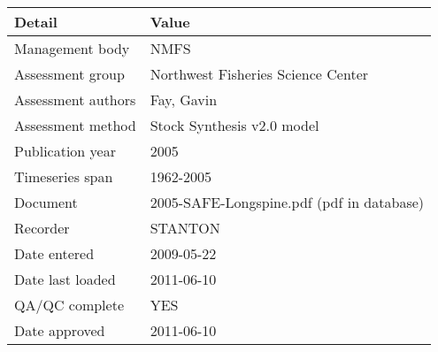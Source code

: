 \begin{table}[htb]
\centering
\begin{tabular}{lp{7cm}}
\toprule
Detail & Value \\
\midrule
Management body    & NMFS                                      \\
Assessment group   & Northwest Fisheries Science Center        \\
Assessment authors & Fay, Gavin                                \\
Assessment method  & Stock Synthesis v2.0 model                \\
Publication year   & 2005                                      \\
Timeseries span    & 1962-2005                                 \\
Document           & 2005-SAFE-Longspine.pdf (pdf in database) \\
Recorder           & STANTON                                   \\
Date entered       & 2009-05-22                                \\
Date last loaded   & 2011-06-10                                \\
QA/QC complete     & YES                                       \\
Date approved      & 2011-06-10                                \\
\bottomrule
\end{tabular}
\label{tab:assessdet}
\end{table}
